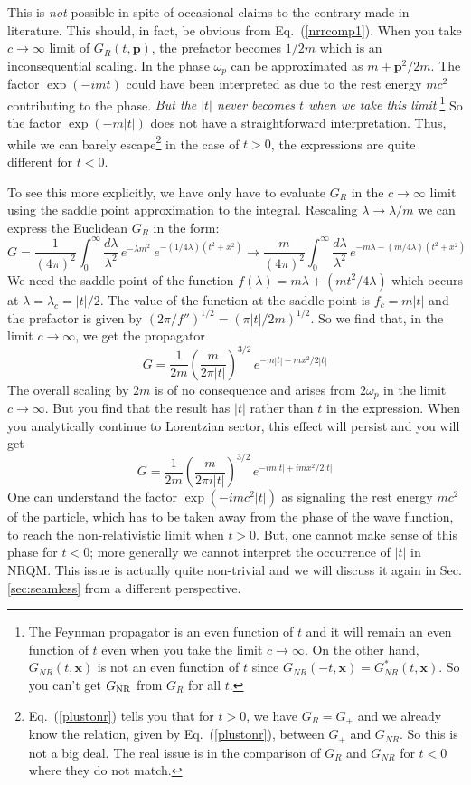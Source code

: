 \documentclass[12pt]{article}
\def\eq#1{{Eq.~(\ref{#1})}}
\def\frab#1#2{\left(\frac{#1}{#2}\right)}
\begin{document}
This is \textit{not} possible in spite of occasional claims  to the contrary made in literature.
This should, in fact, be obvious from \eq{nrrcomp1}. When you take $c\to \infty $ limit of $G_R(t,\bm{p})$, the prefactor becomes $1/2m$ which is an inconsequential scaling.  In the phase $\omega_p$ can be approximated as $m+\bm{p}^2/2m$. The factor $\exp(-imt)$ could have been interpreted as due to the rest energy $mc^2$ contributing to the phase.
\textit{But the $|t|$ never becomes $t$ when we take this limit}.\footnote{The Feynman propagator is an even function of $t$  and it will remain an even function of $t$ even when you take the limit $c\to \infty$. On the other hand, $G_{NR}(t,\bm{x})$ is not an even function of $t$ since $G_{NR}(-t,\bm{x})= G_{NR}^*(t,\bm{x})$. So you can't get $G_{\rm NR}$ from $G_R$ for all $t$.}
So the factor $\exp(-m|t|)$ does not have a straightforward interpretation. Thus, while we can barely escape\footnote{\eq{plustonr} tells you that for $t>0$, we have $G_R=G_+$ and we already know the relation, given by \eq{plustonr},  between $G_+$ and $G_{NR}$. So this is not a big deal. The real issue is in the comparison of $G_R$ and $G_{NR}$ for $t<0$ where they do not match.}  in the case of $t>0$, the expressions are quite different for $t<0$. 

To see this more explicitly, we have only have to evaluate $G_R$ in the $c\to \infty$ limit using the saddle point approximation to the integral.
Rescaling $\lambda \to \lambda/m$ we can express the Euclidean $G_R$ in the form:
\begin{equation}
 G = \frac{1}{(4\pi)^2} \int_0^\infty \frac{d\lambda}{\lambda^2} \, e^{-\lambda m^2} \ e^{-(1/4\lambda) (t^2+x^2)}
 \to \frac{m}{(4\pi)^2} \int_0^\infty \frac{d\lambda}{\lambda^2} \, e^{-m\lambda - (m/4\lambda)(t^2+x^2)}
\end{equation}
We need the saddle point of the function $f(\lambda) = m\lambda + (mt^2/4\lambda)$ 
which occurs at $\lambda =\lambda_c= |t|/2$.
  The value of the function at the saddle point is $f_c = m|t|$
and the prefactor is given by $(2\pi/f'')^{1/2} = (\pi |t|/2m)^{1/2}$. 
  So we find that, in the limit $c\to \infty$, we get the propagator
\begin{equation}
 G = \frac{1}{2m}\frab{m}{2\pi |t|}^{3/2} \, e^{-m|t| - mx^2/2|t|}
\end{equation} 
The overall scaling by $2m$ is of no consequence and arises from  $2\omega_p$ in the limit $c\to \infty$. But you find  
 that the result has $|t|$ rather than $t$ in the expression. When you analytically continue to Lorentzian sector, this effect will persist and you will get
 \begin{equation}
 G = \frac{1}{2m}\frab{m}{2\pi i|t|}^{3/2} \, e^{-im|t| + imx^2/2|t|}
\end{equation} 
 One can understand the factor $\exp(-imc^2 |t|)$ as signaling the rest energy $mc^2$ of the particle, which has to be taken away from the phase of the wave function, to reach the non-relativistic limit when $t>0$. But, one cannot make sense of this phase for $t<0$; more generally we cannot interpret the occurrence of $|t|$ in NRQM. This issue is actually quite non-trivial and we will discuss it again in Sec.\ref{sec:seamless} from a different perspective. 
 
\end{document}
